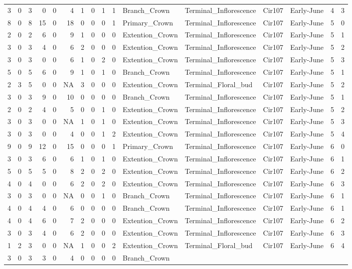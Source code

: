 \documentclass[]{article}
\begin{document}
\begin{longtable}[]{@{}rrrrrrrrrrllllrl@{}}
3 & 0 & 3 & 0 & 0 & 4 & 1 & 0 & 1 & 1 & Branch\_Crown &
Terminal\_Inflorescence & Cir107 & Early-June & 4 & 3\tabularnewline
8 & 0 & 8 & 15 & 0 & 18 & 0 & 0 & 0 & 1 & Primary\_Crown &
Terminal\_Inflorescence & Cir107 & Early-June & 5 & 0\tabularnewline
2 & 0 & 2 & 6 & 0 & 9 & 1 & 0 & 0 & 0 & Extention\_Crown &
Terminal\_Inflorescence & Cir107 & Early-June & 5 & 1\tabularnewline
3 & 0 & 3 & 4 & 0 & 6 & 2 & 0 & 0 & 0 & Extention\_Crown &
Terminal\_Inflorescence & Cir107 & Early-June & 5 & 2\tabularnewline
3 & 0 & 3 & 0 & 0 & 6 & 1 & 0 & 2 & 0 & Extention\_Crown &
Terminal\_Inflorescence & Cir107 & Early-June & 5 & 3\tabularnewline
5 & 0 & 5 & 6 & 0 & 9 & 1 & 0 & 1 & 0 & Branch\_Crown &
Terminal\_Inflorescence & Cir107 & Early-June & 5 & 1\tabularnewline
2 & 3 & 5 & 0 & 0 & NA & 3 & 0 & 0 & 0 & Extention\_Crown &
Terminal\_Floral\_bud & Cir107 & Early-June & 5 & 2\tabularnewline
3 & 0 & 3 & 9 & 0 & 10 & 0 & 0 & 0 & 0 & Branch\_Crown &
Terminal\_Inflorescence & Cir107 & Early-June & 5 & 1\tabularnewline
2 & 0 & 2 & 4 & 0 & 5 & 0 & 0 & 1 & 0 & Extention\_Crown &
Terminal\_Inflorescence & Cir107 & Early-June & 5 & 2\tabularnewline
3 & 0 & 3 & 0 & 0 & NA & 1 & 0 & 1 & 0 & Extention\_Crown &
Terminal\_Inflorescence & Cir107 & Early-June & 5 & 3\tabularnewline
3 & 0 & 3 & 0 & 0 & 4 & 0 & 0 & 1 & 2 & Extention\_Crown &
Terminal\_Inflorescence & Cir107 & Early-June & 5 & 4\tabularnewline
9 & 0 & 9 & 12 & 0 & 15 & 0 & 0 & 0 & 1 & Primary\_Crown &
Terminal\_Inflorescence & Cir107 & Early-June & 6 & 0\tabularnewline
3 & 0 & 3 & 6 & 0 & 6 & 1 & 0 & 1 & 0 & Extention\_Crown &
Terminal\_Inflorescence & Cir107 & Early-June & 6 & 1\tabularnewline
5 & 0 & 5 & 5 & 0 & 8 & 2 & 0 & 2 & 0 & Extention\_Crown &
Terminal\_Inflorescence & Cir107 & Early-June & 6 & 2\tabularnewline
4 & 0 & 4 & 0 & 0 & 6 & 2 & 0 & 2 & 0 & Extention\_Crown &
Terminal\_Inflorescence & Cir107 & Early-June & 6 & 3\tabularnewline
3 & 0 & 3 & 0 & 0 & NA & 0 & 0 & 1 & 0 & Branch\_Crown &
Terminal\_Inflorescence & Cir107 & Early-June & 6 & 1\tabularnewline
4 & 0 & 4 & 4 & 0 & 6 & 0 & 0 & 0 & 0 & Branch\_Crown &
Terminal\_Inflorescence & Cir107 & Early-June & 6 & 1\tabularnewline
4 & 0 & 4 & 6 & 0 & 7 & 2 & 0 & 0 & 0 & Extention\_Crown &
Terminal\_Inflorescence & Cir107 & Early-June & 6 & 2\tabularnewline
3 & 0 & 3 & 4 & 0 & 6 & 2 & 0 & 0 & 0 & Extention\_Crown &
Terminal\_Inflorescence & Cir107 & Early-June & 6 & 3\tabularnewline
1 & 2 & 3 & 0 & 0 & NA & 1 & 0 & 0 & 2 & Extention\_Crown &
Terminal\_Floral\_bud & Cir107 & Early-June & 6 & 4\tabularnewline
3 & 0 & 3 & 3 & 0 & 4 & 0 & 0 & 0 & 0 & Branch\_Crown &

\end{longtable}
\end{document}
